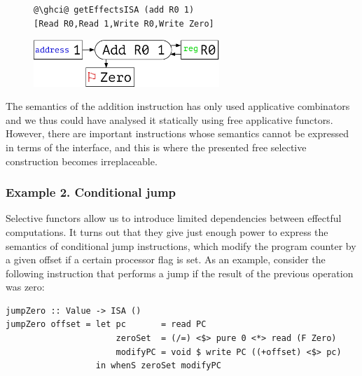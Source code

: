 
\vspace{-1mm}
\begin{figure}[!h]
\begin{minipage}{0.45\textwidth}
\raggedleft
\begin{verbatim}
@\ghci@ getEffectsISA (add R0 1)
[Read R0,Read 1,Write R0,Write Zero]
\end{verbatim}
 \end{minipage}
 \begin{minipage}{0.45\textwidth}
  \centering
  \includegraphics[width=7cm]{./fig/add.pdf}
 \end{minipage}
\end{figure}
\vspace{-1mm}

The semantics of the addition instruction has only used applicative combinators
and we thus could have analysed it statically using free applicative functors.
However, there are important instructions whose semantics cannot be expressed
in terms of the  interface, and this is where the presented
free selective construction becomes irreplaceable.

\subsubsection{Example 2. Conditional jump}

Selective functors allow us to introduce limited dependencies between
effectful computations. It turns out that they give just enough power to
express the semantics of conditional jump instructions, which modify the program
counter by a given offset if a certain processor flag is set. As an example,
consider the following instruction that performs a jump if the result of the
previous operation was zero:

\vspace{1mm}
\begin{verbatim}
jumpZero :: Value -> ISA ()
jumpZero offset = let pc       = read PC
                      zeroSet  = (/=) <$> pure 0 <*> read (F Zero)
                      modifyPC = void $ write PC ((+offset) <$> pc)
                  in whenS zeroSet modifyPC
\end{verbatim}
\vspace{1mm}

